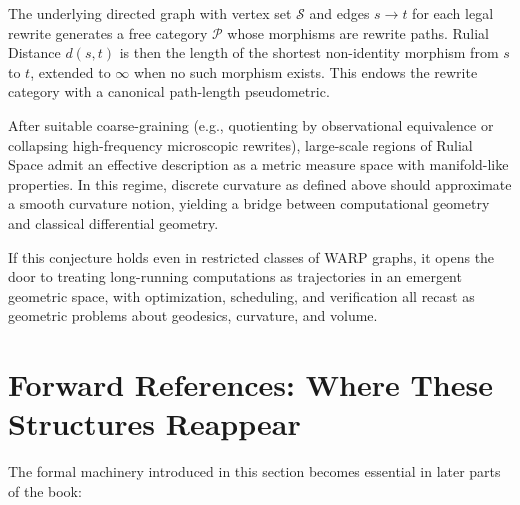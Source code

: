 \begin{remark}
The underlying directed graph with vertex set $\mathcal{S}$ and edges $s \to t$ for each legal rewrite generates a free category $\mathcal{P}$ whose morphisms are rewrite paths. Rulial Distance $d(s,t)$ is then the length of the shortest non-identity morphism from $s$ to $t$, extended to $\infty$ when no such morphism exists. This endows the rewrite category with a canonical path-length pseudometric.
\end{remark}

\begin{conjecture}
After suitable coarse-graining (e.g., quotienting by observational equivalence or collapsing high-frequency microscopic rewrites), large-scale regions of Rulial Space admit an effective description as a metric measure space with manifold-like properties. In this regime, discrete curvature as defined above should approximate a smooth curvature notion, yielding a bridge between computational geometry and classical differential geometry.
\end{conjecture}

\begin{remark}
If this conjecture holds even in restricted classes of WARP graphs, it opens the door to treating long-running computations as trajectories in an emergent geometric space, with optimization, scheduling, and verification all recast as geometric problems about geodesics, curvature, and volume.
\end{remark}

\section*{Forward References: Where These Structures Reappear}

The formal machinery introduced in this section becomes essential in later parts of the book:

